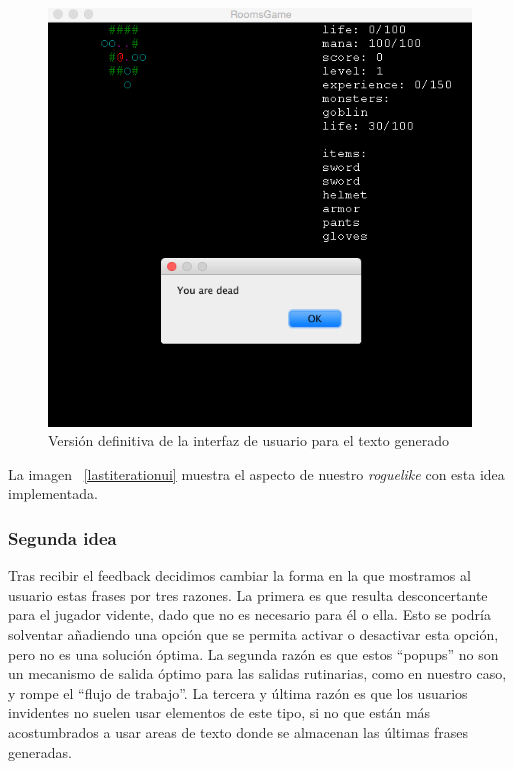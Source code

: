 \begin{figure}
    \includegraphics[width=\textwidth,height=\textheight,keepaspectratio]{./img/firstiterationui.png}
  \caption{Versión definitiva de la interfaz de usuario para el texto generado}
  \label{fig:firstiterationui}
\end{figure}

La imagen ~\ref{lastiterationui} muestra el aspecto de nuestro \textit{roguelike} con esta idea implementada.

\subsubsection{Segunda idea}

Tras recibir el feedback decidimos cambiar la forma en la que mostramos al usuario estas frases por tres razones. La primera es que resulta desconcertante para el jugador vidente, dado que no es necesario para él o ella. Esto se podría solventar añadiendo una opción que se permita activar o desactivar esta opción, pero no es una solución óptima.
La segunda razón es que estos ``popups'' no son un mecanismo de salida óptimo para las salidas rutinarias, como en nuestro caso, y rompe el ``flujo de trabajo''.
La tercera y última razón es que los usuarios invidentes no suelen usar elementos de este tipo, si no que están más acostumbrados a usar areas de texto donde se almacenan las últimas frases generadas.

